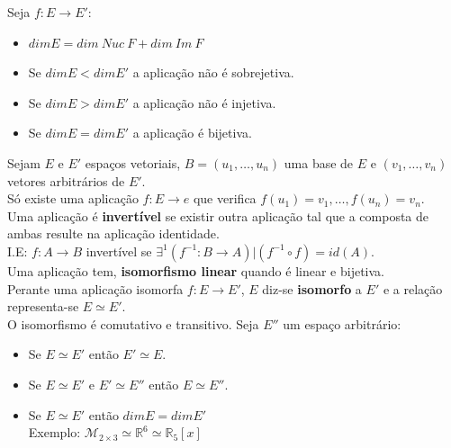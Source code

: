 \documentclass[]{report}
\begin{document}
Seja $f:E \to E'$:
\begin{itemize}
\item $dim E = dim \> Nuc \> F + dim \> Im \> F$
\item Se $dim E < dim E'$ a aplicação não é sobrejetiva.
\item Se $dim E > dim E'$ a aplicação não é injetiva.
\item Se $dim E = dim E'$ a aplicação é bijetiva.
\end{itemize}
Sejam $E$ e $E'$ espaços vetoriais, $B=(u_1, \dots, u_n)$ uma base de $E$ e $(v_1, \dots, v_n)$ vetores arbitrários de $E'$.\\
Só existe uma aplicação $f:E \to e$ que verifica $f(u_1) = v_1, \dots, f(u_n) = v_n$.\\[2mm]
Uma aplicação é \textbf{invertível} se existir outra aplicação tal que a composta de ambas resulte na aplicação identidade.\\
I.E: $f:A\to B$ invertível se $\exists^1 (f^{-1}:B\to A) | (f^{-1} \circ f) = id(A)$.\\[2mm]
Uma aplicação tem, \textbf{isomorfismo linear} quando é linear e bijetiva.\\
Perante uma aplicação isomorfa $f: E \to E'$, $E$ diz-se \textbf{isomorfo} a $E'$ e a relação representa-se $E \simeq E'$.\\
O isomorfismo é comutativo e transitivo. Seja $E''$ um espaço arbitrário:
\begin{itemize}
\item Se $E \simeq E'$ então $E' \simeq E$.
\item Se $E \simeq E'$ e $E' \simeq E''$ então $E \simeq E''$.
\item Se $E \simeq E'$ então $dim E = dim E'$\\
Exemplo: $\mathcal{M}_{2 \times 3} \simeq \mathbb{R}^6 \simeq \mathbb{R}_{5}[x]$
\end{itemize}
\end{document}
